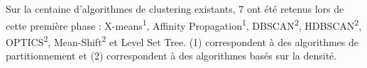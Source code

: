 \documentclass{llncs}
\begin{document}
Sur la centaine d'algorithmes de clustering existants, 7 ont été retenus lors de cette première phase : X-means\textsuperscript{1}, Affinity Propagation\textsuperscript{1}, DBSCAN\textsuperscript{2}, HDBSCAN\textsuperscript{2}, OPTICS\textsuperscript{2}, Mean-Shift\textsuperscript{2} et Level Set Tree. (1) correspondent à des algorithmes de partitionnement et (2) correspondent à des algorithmes basés sur la densité.






\end{document}
